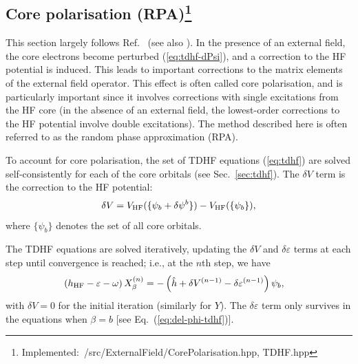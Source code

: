 \documentclass[10pt,twocolumn,a4paper]{article}%
\newcommand{\be}{\begin{equation}}
\newcommand{\ee}{\end{equation}}
\def\en{\ensuremath{\varepsilon}}
\renewcommand{\b}{\ensuremath{\beta}}
\newcommand{\w}{\ensuremath{\omega}}
\begin{document}




\subsection[Core polarisation (RPA)]{Core polarisation (RPA)\footnote{Implemented:~/src/ExternalField/CorePolarisation.hpp, TDHF.hpp}\label{sec:RPA}}

This section largely follows Ref.~\cite{DzubaHFS1984} (see also \cite{Dzuba2018a,Manakov1986,Johnson1980,Johnson1989}).
In the presence of an external field, the core electrons become perturbed (\ref{eq:tdhf-dPsi}), and a correction to the HF potential is induced.
This leads to important corrections to the matrix elements of the external field operator.
This effect is often called core polarisation, and is particularly important since it involves corrections with single excitations from the HF core (in the absence of an external field, the lowest-order corrections to the HF potential involve double excitations).
The method described here is often referred to as the random phase approximation (RPA).


To account for core polarisation, the set of TDHF equations (\ref{eq:tdhf}) are solved self-consistently for each of the core orbitals (see Sec.~\ref{sec:tdhf}).
%
The $\delta V$ term is the correction to the HF potential:
\be\label{eq:delV-simple}
\delta V = V_{\rm HF}(\{\psi_b + \delta\psi^b\}) - V_{\rm HF}(\{\psi_b\}),
\ee
where $\{\psi_b\}$ denotes the set of all core orbitals.

The TDHF equations are solved iteratively, updating the $\delta V$ and $\delta \en$  terms at each step
until convergence is reached; i.e., at the $n$th step, we have
\begin{equation}\begin{split}
\label{eq:tdhf-rpa}
\left( h_{\rm HF} - \en -\w \right)X_\beta^{(n)} &= -\left(\hat h + \delta V^{(n-1)} - \delta \en^{(n-1)} \right)\psi_b,
\end{split}\end{equation}
with $\delta V=0$ for the initial iteration (similarly for $Y$).
The $\delta\en$ term only survives in the equations when $\b=b$ [see Eq.~(\ref{eq:del-phi-tdhf})].
\end{document}
